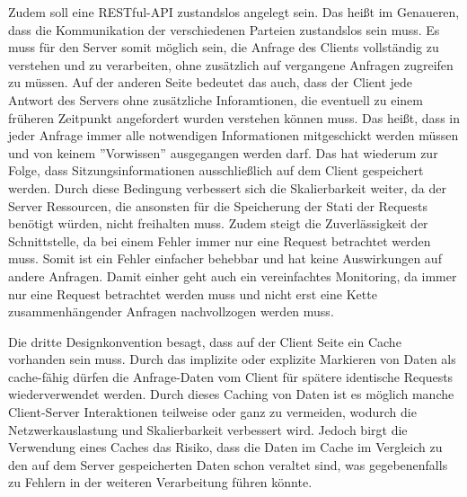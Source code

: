 Zudem soll eine RESTful-API zustandslos angelegt sein. Das hei{\ss}t im Genaueren, dass die Kommunikation der verschiedenen Parteien zustandslos sein muss. Es muss für den Server somit möglich sein, die Anfrage des Clients vollständig zu verstehen und zu verarbeiten, ohne zusätzlich auf vergangene Anfragen zugreifen zu müssen. Auf der anderen Seite bedeutet das auch, dass der Client jede Antwort des Servers ohne zusätzliche Inforamtionen, die eventuell zu einem früheren Zeitpunkt angefordert wurden verstehen können muss. Das hei{\ss}t, dass in jeder Anfrage immer alle notwendigen Informationen mitgeschickt werden müssen und von keinem ''Vorwissen'' ausgegangen werden darf. Das hat wiederum zur Folge, dass Sitzungsinformationen ausschlie{\ss}lich auf dem Client gespeichert werden. Durch diese Bedingung verbessert sich die Skalierbarkeit weiter, da der Server Ressourcen, die ansonsten für die Speicherung der Stati der Requests benötigt würden, nicht freihalten muss. Zudem steigt die Zuverlässigkeit der Schnittstelle, da bei einem Fehler immer nur eine Request betrachtet werden muss. Somit ist ein Fehler einfacher behebbar und hat keine Auswirkungen auf andere Anfragen. Damit einher geht auch ein vereinfachtes Monitoring, da immer nur eine Request betrachtet werden muss und nicht erst eine Kette zusammenhängender Anfragen nachvollzogen werden muss.

Die dritte Designkonvention besagt, dass auf der Client Seite ein Cache vorhanden sein muss. Durch das implizite oder explizite Markieren von Daten als cache-fähig dürfen die Anfrage-Daten vom Client für spätere identische Requests wiederverwendet werden. Durch dieses Caching von Daten ist es möglich manche Client-Server Interaktionen teilweise oder ganz zu vermeiden, wodurch die Netzwerkauslastung und Skalierbarkeit verbessert wird. Jedoch birgt die Verwendung eines Caches das Risiko, dass die Daten im Cache im Vergleich zu den auf dem Server gespeicherten Daten schon veraltet sind, was gegebenenfalls zu Fehlern in der weiteren Verarbeitung führen könnte.


